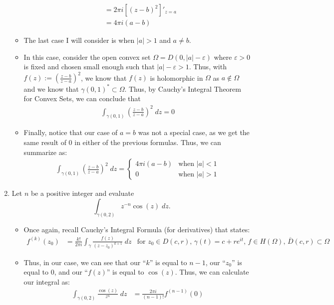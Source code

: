 \documentclass[10pt,a4paper]{article}
\theoremstyle{definition}
\begin{document}
\begin{enumerate}[label = (\alph*)]
\begin{itemize}
\begin{align*}
	&= 2\pi i \left[(z - b)^2\right]'_{z = a}\\
	&= 4\pi i (a - b)
	\end{align*}
	\item The last case I will consider is when $|a| > 1$ and $a \neq b$.
	\item In this case, consider the open convex set $\Omega = D(0, |a| - \varepsilon)$ where $\varepsilon > 0$ is fixed and chosen small enough such that $|a| - \varepsilon > 1$. Thus, with $\displaystyle f(z) := \left(\frac{z - b}{z - a}\right)^2$, we know that $f(z)$ is holomorphic in $\Omega$ as $a \not \in \Omega$ and we know that $\gamma(0,1)^* \subset \Omega$. Thus, by Cauchy's Integral Theorem for Convex Sets, we can conclude that 
	\begin{align*}
	\int_{\gamma(0,1)} \left(\frac{z - b}{z -a}\right)^2 \; dz = 0
	\end{align*}
	\item Finally, notice that our case of $a = b$ was not a special case, as we get the same result of 0 in either of the previous formulas. Thus, we can summarize as:
	\begin{align*}
	\boxed{\int_{\gamma(0,1)} \left(\frac{z - b}{z - a}\right)^2 \; dz = \begin{cases}
	4\pi i(a - b) &\text{when $|a| < 1$}\\
	0 &\text{when $|a| > 1$}
	\end{cases}}
	\end{align*}
	\end{itemize}
\item Let $n$ be a positive integer and evaluate 
\[\int_{\gamma(0,2)} z^{-n}\cos(z) \; dz.\]
	\begin{itemize}
	\item Once again, recall Cauchy's Integral Formula (for derivatives) that states:
	\begin{align*}
		f^{(k)}(z_0) &= \frac{k!}{2\pi i} \int_{\gamma} \frac{f(z)}{(z - z_0)^{k+1}} \; dz &\text{for $z_0 \in D(c, r)$, $\gamma(t) = c + re^{it}$, $f \in H(\Omega)$, $\overline{D}(c, r) \subset \Omega$}
	\end{align*}
	\item Thus, in our case, we can see that our \enquote{$k$} is equal to $n - 1$, our \enquote{$z_0$} is equal to 0, and our \enquote{$f(z)$} is equal to $\cos(z)$. Thus, we can calculate our integral as:
	\begin{align*}
	\int_{\gamma(0,2)} \frac{\cos(z)}{z^n} \; dz &= \frac{2\pi i}{(n - 1)!} f^{(n - 1)}(0)
	\end{align*}

\end{itemize}
\end{enumerate}
\end{document}
